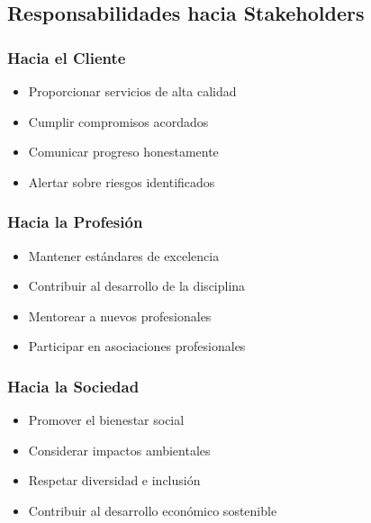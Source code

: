 \documentclass[12pt,letterpaper,oneside]{book}
\begin{document}
\subsection{Responsabilidades hacia Stakeholders}

\subsubsection{Hacia el Cliente}

\begin{itemize}
\item Proporcionar servicios de alta calidad
\item Cumplir compromisos acordados
\item Comunicar progreso honestamente
\item Alertar sobre riesgos identificados
\end{itemize}

\subsubsection{Hacia la Profesión}

\begin{itemize}
\item Mantener estándares de excelencia
\item Contribuir al desarrollo de la disciplina
\item Mentorear a nuevos profesionales
\item Participar en asociaciones profesionales
\end{itemize}

\subsubsection{Hacia la Sociedad}

\begin{itemize}
\item Promover el bienestar social
\item Considerar impactos ambientales
\item Respetar diversidad e inclusión
\item Contribuir al desarrollo económico sostenible
\end{itemize}
\end{document}
